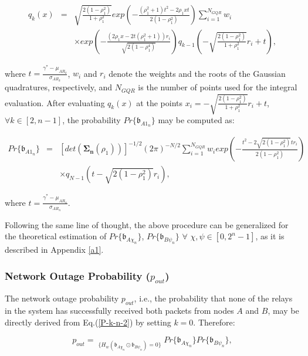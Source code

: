 \documentclass[12pt,draftcls, onecolumn]{IEEEtran}
\begin{document}
\begingroup
\begin{eqnarray}
q_k(x) & = & \sqrt{\frac{2\left(1-\rho_1^2\right)}{1+\rho_1^2}}exp\left(-\frac{\left(\rho_1^2+1\right)t^2-2\rho_1 xt}{2\left(1-\rho_1^2\right)}\right) \sum^{N_{GQR}}_{i=1}w_i \nonumber\\
			 && \times exp\left(-\frac{\left(2\rho_1 x - 2t\left(\rho_1^2+1\right)\right)r_i}{\sqrt{2\left(1-\rho_1^4\right)}}\right)q_{k-1}\left(-\sqrt{\frac{2\left(1-\rho_1^2\right)}{1+\rho_1^2}}r_i+t\right)\label{eq:qk1},
\end{eqnarray}
\endgroup

\noindent where $t=\frac{\gamma^*-\mu_{AR_k}}{\sigma_{AR_k}}$, $w_i$ and $r_i$ denote the weights and the roots of the Gaussian quadratures\cite{1969method}, respectively, and $N_{GQR}$ is the number of points used for the integral evaluation. After evaluating $q_k(x)$ at the points $x_i = -\sqrt{\frac{2\left(1-\rho^2_1\right)}{1+\rho^2_1}}r_i+t$, $\forall k \in [2,n-1]$, the probability $Pr\{\mathfrak{b}_{A1_n}\}$ may be computed as:

\begingroup
\begin{eqnarray}
Pr\{\mathfrak{b}_{A1_n}\} & = & [det\left(\mathbf{\Sigma_n}(\rho_1)\right)]^{-1/2}\left(2\pi\right)^{-N/2}\sum^{N_{GQR}}_{i=1}w_iexp\left(-\frac{t^2 - 2\sqrt{2\left(1-\rho_1^2\right)}tr_i}{2\left(1-\rho_1^2\right)}\right)\nonumber\\
&& \times q_{N-1}\left(t-\sqrt{2\left(1-\rho_1^2\right)}r_i\right),
\end{eqnarray}
\endgroup

\noindent where $t=\frac{\gamma^*-\mu_{AR_n}}{\sigma_{AR_n}}$.

Following the same line of thought, the above procedure can be generalized for the theoretical estimation of $Pr\{\mathfrak{b}_{A\chi_n}\}$, $Pr\{\mathfrak{b}_{B\psi_n}\}$ $\forall$ $\chi,\psi\in \left[0,2^n-1\right]$, as it is described in Appendix \ref{a1}.

\subsubsection{Network Outage Probability ($p_{out}$)}

The network outage probability $p_{out}$, i.e., the probability that none of the relays in the system has successfully received both packets from nodes $A$ and $B$, may be directly derived from Eq.(\ref{P-k-n-2}) by setting $k=0$. Therefore:

\begingroup
\small
\begin{equation}
p_{out} = \mathop{\sum_{\chi=0}^{2^n-1}\sum_{\psi=0}^{2^n-1}}_{\{H_w\left(\mathfrak{b}_{A\chi_n}\odot \mathfrak{b}_{B\psi_n}\right) = 0\}}Pr\{\mathfrak{b}_{A\chi_n}\}Pr\{\mathfrak{b}_{B\psi_n}\}, \label{P-out}
\end{equation}
\endgroup
\end{document}
